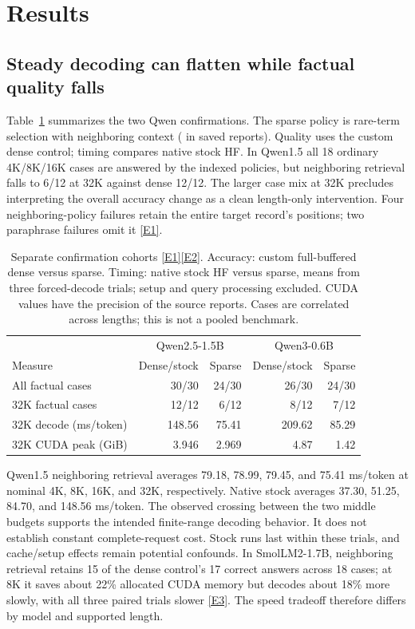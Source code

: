 \documentclass[11pt,letterpaper]{article}
\newcommand{\ev}[1]{\hyperref[app:evidence]{[E#1]}}
\newcommand{\code}[1]{\texttt{\detokenize{#1}}}
\begin{document}
\section{Results}
\subsection{Steady decoding can flatten while factual quality falls}
Table~\ref{tab:confirm} summarizes the two Qwen confirmations. The sparse policy is rare-term selection with neighboring context (\code{rare-context} in saved reports). Quality uses the custom dense control; timing compares native stock HF. In Qwen1.5 all 18 ordinary 4K/8K/16K cases are answered by the indexed policies, but neighboring retrieval falls to 6/12 at 32K against dense 12/12. The larger case mix at 32K precludes interpreting the overall accuracy change as a clean length-only intervention. Four neighboring-policy failures retain the entire target record's positions; two paraphrase failures omit it \ev{1}.

\begin{table}[ht]
\centering\small
\begin{tabular}{lrrrr}
\toprule
 & \multicolumn{2}{c}{Qwen2.5-1.5B} & \multicolumn{2}{c}{Qwen3-0.6B}\\
Measure & Dense/stock & Sparse & Dense/stock & Sparse\\\midrule
All factual cases & 30/30 & 24/30 & 26/30 & 24/30\\
32K factual cases & 12/12 & 6/12 & 8/12 & 7/12\\
32K decode (ms/token) & 148.56 & 75.41 & 209.62 & 85.29\\
32K CUDA peak (GiB) & 3.946 & 2.969 & 4.87 & 1.42\\\bottomrule
\end{tabular}
\caption{Separate confirmation cohorts \ev{1}\ev{2}. Accuracy: custom full-buffered dense versus sparse. Timing: native stock HF versus sparse, means from three forced-decode trials; setup and query processing excluded. CUDA values have the precision of the source reports. Cases are correlated across lengths; this is not a pooled benchmark.}\label{tab:confirm}
\end{table}

Qwen1.5 neighboring retrieval averages 79.18, 78.99, 79.45, and 75.41 ms/token at nominal 4K, 8K, 16K, and 32K, respectively. Native stock averages 37.30, 51.25, 84.70, and 148.56 ms/token. The observed crossing between the two middle budgets supports the intended finite-range decoding behavior. It does not establish constant complete-request cost. Stock runs last within these trials, and cache/setup effects remain potential confounds. In SmolLM2-1.7B, neighboring retrieval retains 15 of the dense control's 17 correct answers across 18 cases; at 8K it saves about 22\% allocated CUDA memory but decodes about 18\% more slowly, with all three paired trials slower \ev{3}. The speed tradeoff therefore differs by model and supported length.
\end{document}
